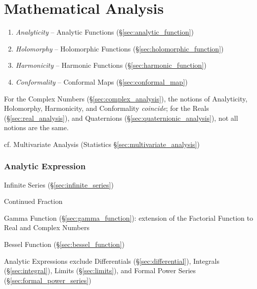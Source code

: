 \part{Mathematical Analysis}\label{part:mathematical_analysis}

\begin{enumerate}
  \item \emph{Analyticity} -- Analytic Functions (\S\ref{sec:analytic_function})
  \item \emph{Holomorphy} -- Holomorphic Functions
    (\S\ref{sec:holomorphic_function})
  \item \emph{Harmonicity} -- Harmonic Functions
    (\S\ref{sec:harmonic_function})
  \item \emph{Conformality} -- Conformal Maps (\S\ref{sec:conformal_map})
\end{enumerate}
For the Complex Numbers (\S\ref{sec:complex_analysis}), the notions of
Analyticity, Holomorphy, Harmonicity, and Conformality \emph{coincide}; for the
Reals (\S\ref{sec:real_analysis}), and Quaternions
(\S\ref{sec:quaternionic_analysis}), not all notions are the same.

\fist cf. Multivariate Analysis (Statistics
\S\ref{sec:multivariate_analysis})



\section{Analytic Expression}\label{sec:analytic_expression}

Infinite Series (\S\ref{sec:infinite_series})

Continued Fraction

Gamma Function (\S\ref{sec:gamma_function}): extension of the Factorial
Function to Real and Complex Numbers

Bessel Function (\S\ref{sec:bessel_function})

Analytic Expressions exclude Differentials (\S\ref{sec:differential}),
Integrals (\S\ref{sec:integral}), Limits (\S\ref{sec:limits}), and Formal Power
Series (\S\ref{sec:formal_power_series})

